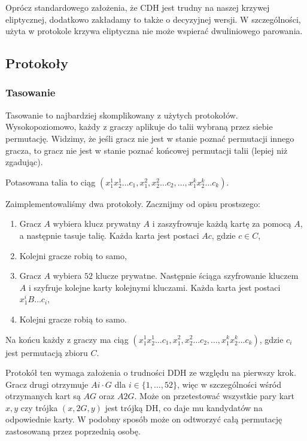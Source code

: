 \documentclass{article}
\begin{document}
Oprócz standardowego założenia, że CDH jest trudny na naszej krzywej eliptycznej, dodatkowo zakładamy to także o decyzyjnej wersji. W szczególności, użyta w protokole krzywa eliptyczna nie może wspierać dwuliniowego parowania.

\subsection{Protokoły}
\subsubsection{Tasowanie}

Tasowanie to najbardziej skomplikowany z użytych protokołów. Wysokopoziomowo, każdy z graczy aplikuje do talii wybraną przez siebie permutację. Widzimy, że jeśli gracz nie jest w stanie poznać permutacji innego gracza, to gracz nie jest w stanie poznać końcowej permutacji talii (lepiej niż zgadując).


Potasowana talia to ciąg $(x_1^1x_2^1\ldots c_1, x_1^2,x_2^2\ldots c_2, \ldots, x_1^kx_2^k\ldots c_k)$.

Zaimplementowaliśmy dwa protokoły. Zacznijmy od opisu prostszego:

\begin{enumerate}
    \item Gracz $A$ wybiera klucz prywatny $A$ i zaszyfrowuje każdą kartę za pomocą $A$, a następnie tasuje talię. Każda karta jest postaci $Ac$, gdzie $c \in C$,

    \item Kolejni gracze robią to samo,

    \item Gracz $A$ wybiera $52$ klucze prywatne. Następnie ściąga szyfrowanie kluczem $A$ i szyfruje kolejne karty kolejnymi kluczami. Każda karta jest postaci $x_1^iB\ldots c_i$,

    \item Kolejni gracze robią to samo.
\end{enumerate}

Na końcu każdy z graczy ma ciąg $(x_1^1x_2^1\ldots c_1, x_1^2,x_2^2\ldots c_2, \ldots, x_1^kx_2^k\ldots c_k)$, gdzie $c_i$ jest permutacją zbioru $C$.

Protokół ten wymaga założenia o trudności DDH ze względu na pierwszy krok. Gracz drugi otrzymuje $Ai\cdot G$ dla $i\in \{1,\ldots,52\}$, więc w szczególności wśród otrzymanych kart są $AG$ oraz $A2G$. Może on przetestować wszystkie pary kart $x,y$ czy trójka $(x,2G,y)$ jest trójką DH, co daje mu kandydatów na odpowiednie karty. W podobny sposób może on odtworzyć całą permutację zastosowaną przez poprzednią osobę.
\end{document}
